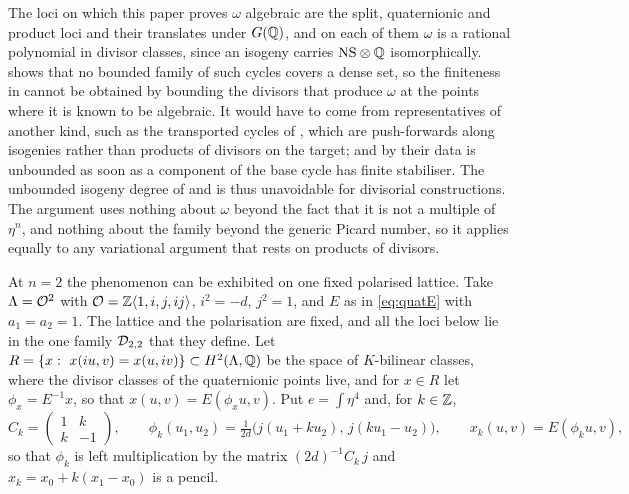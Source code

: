 \begin{remark}\label{rem:divroute}
The loci on which this paper proves $\omega$ algebraic are the split,
quaternionic and product loci and their translates under $G(\mathbb{Q})$, and on
each of them $\omega$ is a rational polynomial in divisor classes, since an
isogeny carries $\mathrm{NS}\otimes\mathbb{Q}$ isomorphically.  shows
that no bounded family of such cycles covers a dense set, so the finiteness
in  cannot be obtained by bounding the divisors that
produce $\omega$ at the points where it is known to be algebraic. It would
have to come from representatives of another kind, such as the transported
cycles of , which are push-forwards along isogenies
rather than products of divisors on the target; and by 
their data is unbounded as soon as a component of the base cycle has finite
stabiliser. The unbounded isogeny degree of  and
 is thus unavoidable for divisorial constructions.
The argument uses nothing about $\omega$ beyond the fact that it is not a
multiple of $\eta^{n}$, and nothing about the family beyond the generic
Picard number, so it applies equally to any variational argument that rests
on products of divisors.
\end{remark}

At $n=2$ the phenomenon can be exhibited on one fixed polarised lattice. Take
$\Lambda=\mathcal{O}^{2}$ with $\mathcal{O}=\mathbb{Z}\langle1,i,j,ij\rangle$, $i^{2}=-d$, $j^{2}=1$,
and $E$ as in \eqref{eq:quatE} with $a_{1}=a_{2}=1$. The lattice and the
polarisation are fixed, and all the loci below lie in the one family
$\mathcal{D}_{2,2}$ that they define. Let
$R=\{x:\ x(iu,v)=x(u,iv)\}\subset H^{2}(\Lambda,\mathbb{Q})$ be the space of
$K$-bilinear classes, where the divisor classes of the quaternionic points
live, and for $x\in R$ let $\phi_{x}=E^{-1}x$, so that $x(u,v)=E(\phi_{x}u,v)$.
Put $e=\int\eta^{4}$ and, for $k\in\mathbb{Z}$,
\[
  C_{k}=\begin{pmatrix}1&k\\k&-1\end{pmatrix},\qquad
  \phi_{k}(u_{1},u_{2})=\tfrac{1}{2d}\bigl(j(u_{1}+ku_{2}),\,j(ku_{1}-u_{2})\bigr),
  \qquad x_{k}(u,v)=E(\phi_{k}u,v),
\]
so that $\phi_{k}$ is left multiplication by the matrix $(2d)^{-1}C_{k}\,j$
and $x_{k}=x_{0}+k(x_{1}-x_{0})$ is a pencil.

